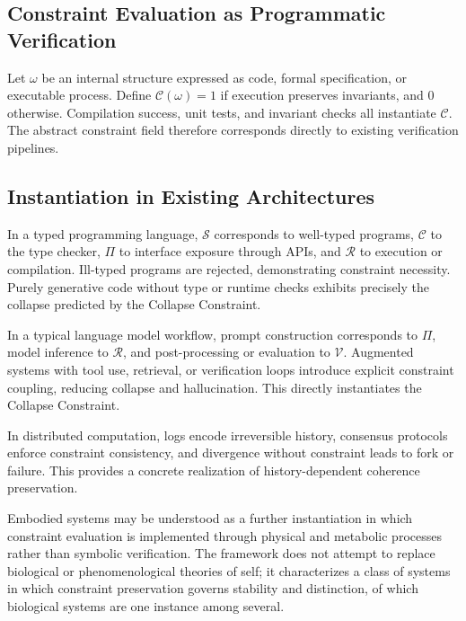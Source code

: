 \documentclass[12pt, a4paper]{article}
\theoremstyle{plain}
\theoremstyle{definition}
\theoremstyle{remark}
\begin{document}
\subsection{Constraint Evaluation as Programmatic Verification}

Let $\omega$ be an internal structure expressed as code, formal specification, or executable process. Define $\mathcal{C}(\omega) = 1$ if execution preserves invariants, and $0$ otherwise. Compilation success, unit tests, and invariant checks all instantiate $\mathcal{C}$. The abstract constraint field therefore corresponds directly to existing verification pipelines.

\subsection{Instantiation in Existing Architectures}

In a typed programming language, $\mathcal{S}$ corresponds to well-typed programs, $\mathcal{C}$ to the type checker, $\Pi$ to interface exposure through APIs, and $\mathcal{R}$ to execution or compilation. Ill-typed programs are rejected, demonstrating constraint necessity. Purely generative code without type or runtime checks exhibits precisely the collapse predicted by the Collapse Constraint.

In a typical language model workflow, prompt construction corresponds to $\Pi$, model inference to $\mathcal{R}$, and post-processing or evaluation to $\mathcal{V}$. Augmented systems with tool use, retrieval, or verification loops introduce explicit constraint coupling, reducing collapse and hallucination. This directly instantiates the Collapse Constraint.

In distributed computation, logs encode irreversible history, consensus protocols enforce constraint consistency, and divergence without constraint leads to fork or failure. This provides a concrete realization of history-dependent coherence preservation.

Embodied systems may be understood as a further instantiation in which constraint evaluation is implemented through physical and metabolic processes rather than symbolic verification. The framework does not attempt to replace biological or phenomenological theories of self; it characterizes a class of systems in which constraint preservation governs stability and distinction, of which biological systems are one instance among several.

\end{document}
